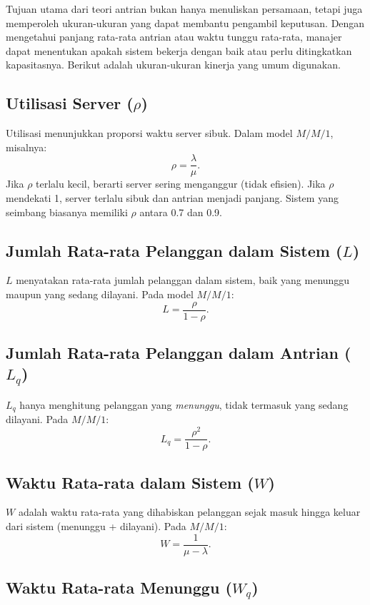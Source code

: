 \documentclass{bukumjh}
\begin{document}
Tujuan utama dari teori antrian bukan hanya menuliskan persamaan, tetapi juga memperoleh ukuran-ukuran yang dapat membantu pengambil keputusan. Dengan mengetahui panjang rata-rata antrian atau waktu tunggu rata-rata, manajer dapat menentukan apakah sistem bekerja dengan baik atau perlu ditingkatkan kapasitasnya. Berikut adalah ukuran-ukuran kinerja yang umum digunakan.

\subsection{Utilisasi Server ($\rho$)}

Utilisasi menunjukkan proporsi waktu server sibuk. Dalam model $M/M/1$, misalnya:
\[
\rho = \frac{\lambda}{\mu}.
\]
Jika $\rho$ terlalu kecil, berarti server sering menganggur (tidak efisien). Jika $\rho$ mendekati 1, server terlalu sibuk dan antrian menjadi panjang. Sistem yang seimbang biasanya memiliki $\rho$ antara 0.7 dan 0.9.

\subsection{Jumlah Rata-rata Pelanggan dalam Sistem ($L$)}

$L$ menyatakan rata-rata jumlah pelanggan dalam sistem, baik yang menunggu maupun yang sedang dilayani. Pada model $M/M/1$:
\[
L = \frac{\rho}{1-\rho}.
\]

\subsection{Jumlah Rata-rata Pelanggan dalam Antrian ($L_q$)}

$L_q$ hanya menghitung pelanggan yang \textit{menunggu}, tidak termasuk yang sedang dilayani. Pada $M/M/1$:
\[
L_q = \frac{\rho^2}{1-\rho}.
\]

\subsection{Waktu Rata-rata dalam Sistem ($W$)}

$W$ adalah waktu rata-rata yang dihabiskan pelanggan sejak masuk hingga keluar dari sistem (menunggu + dilayani). Pada $M/M/1$:
\[
W = \frac{1}{\mu - \lambda}.
\]

\subsection{Waktu Rata-rata Menunggu ($W_q$)}
\end{document}

